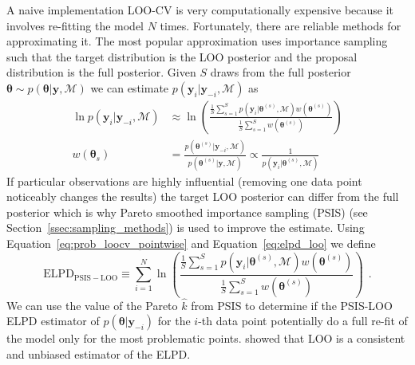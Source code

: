 \documentclass[12pt,dvipsnames]{report}
\renewcommand{\vec}[1]{\boldsymbol{\mathbf{#1}}}
\newcommand{\hquad}{~~}
\begin{document}
A naive implementation LOO-CV is very computationally expensive because it 
involves re-fitting the model $N$ times. Fortunately, there are reliable methods for 
approximating it. 
The most popular approximation uses importance sampling such that the target 
distribution is the LOO posterior and the proposal distribution is the full
posterior. Given $S$ draws from the full posterior 
$\vec\theta\sim p(\vec\theta|\vec y, \mathcal{M})$ we can estimate 
$p(\vec y_i\lvert \vec y_{-i},\mathcal{M})$ as 
\begin{align}
\ln p\left(\vec y_{i} \lvert \vec y_{-i},\mathcal{M}\right)&\approx\ln\left(\frac{\frac{1}{S} \sum_{s=1}^{S} p\left(\vec y_{i} \lvert\vec \theta^{(s)},\mathcal{M}\right) w\left(\vec\theta^{(s)}\right)}{\frac{1}{S} \sum_{s=1}^{S} w\left(\vec\theta^{(s)}\right)}\right) \\
\label{eq:prob_loocv_pointwise}
w\left(\vec\theta_{s}\right)&=\frac{p\left(\vec\theta^{(s)} \lvert \vec y_{-i},\mathcal{M}\right)}{p\left(\vec\theta^{(s)} \lvert\vec y,\mathcal{M}\right)} \propto \frac{1}{p\left(\vec y_{i} \lvert\vec\theta^{(s)},\mathcal{M}\right)}
\end{align}
If particular observations are highly influential (removing one data point 
noticeably changes the results) the target LOO posterior can differ 
from the full posterior which is why Pareto smoothed importance sampling (PSIS) 
(see Section~\ref{ssec:sampling_methods}) is used to improve the estimate. 
Using Equation~\ref{eq:prob_loocv_pointwise} and Equation~\ref{eq:elpd_loo}
we define \citep{2015arXiv150704544V} 
\begin{equation}
\mathrm{ELPD}_\mathrm{PSIS-LOO}\equiv\sum_{i=1}^N\ln\left(\frac{\frac{1}{S} \sum_{s=1}^{S} p\left(\vec y_{i} \lvert\vec \theta^{(s)},\mathcal{M}\right) w\left(\vec\theta^{(s)}\right)}{\frac{1}{S} \sum_{s=1}^{S} w\left(\vec\theta^{(s)}\right)}\right) \hquad .
\label{eq:elpd_psis_loo}
\end{equation}
We can use the value of the Pareto $\hat k$ from PSIS to determine if the 
PSIS-LOO ELPD estimator of $p(\vec\theta\lvert\vec y_{-i})$ for the $i$-th data 
point potentially do a full re-fit of the model only for the most problematic 
points. \citet{arXiv:1004.2316} showed that LOO is a consistent and unbiased estimator of 
the ELPD.
\end{document}
